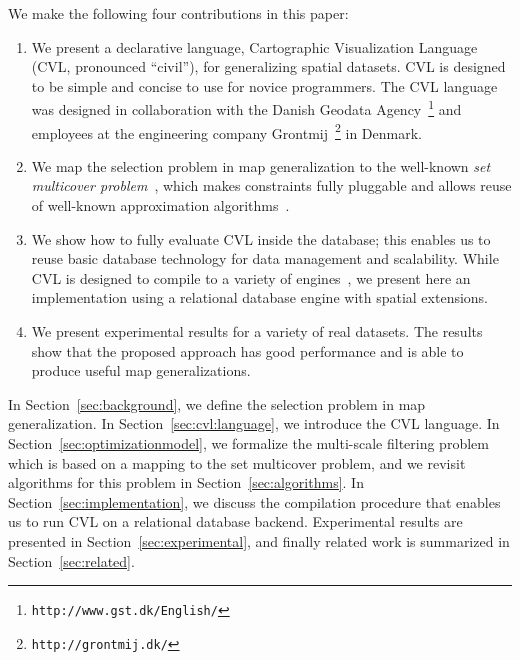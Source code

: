 We make the following four contributions in this paper:
\begin{enumerate}
\item We present a declarative language, Cartographic Visualization Language (CVL, pronounced ``civil''), for generalizing spatial datasets. CVL is designed to be simple and concise to use for novice programmers. The CVL language was designed in collaboration with the Danish Geodata Agency~\footnote{\texttt{http://www.gst.dk/English/}} and employees at the engineering company Grontmij~\footnote{\texttt{http://grontmij.dk/}} in Denmark.

\item We map the selection problem in map generalization to the well-known \emph{set multicover problem}~\cite{rajagopalan1998primal}, which makes constraints fully pluggable and allows reuse of well-known approximation algorithms~\cite{rajagopalan1998primal,vazirani2001approximation}.

\item We show how to fully evaluate CVL inside the database; this enables us to reuse basic database technology for data management and scalability. While CVL is designed to compile to a variety of engines~\cite{Stonebraker:2010:PDBMSvsMapReduce}, we present here an implementation using a relational database engine with spatial extensions.

\item We present experimental results for a variety of real datasets. The results show that the proposed approach has good performance and is able to produce useful map generalizations.
\end{enumerate}

In Section~\ref{sec:background}, we define the selection problem in map generalization. In Section~\ref{sec:cvl:language}, we introduce the CVL language. In Section~\ref{sec:optimizationmodel}, we formalize the multi-scale filtering problem which is based on a mapping to the set multicover problem, and we revisit algorithms for this problem in Section~\ref{sec:algorithms}. In Section~\ref{sec:implementation}, we discuss the compilation procedure that enables us to run CVL on a relational database backend. Experimental results are presented in Section~\ref{sec:experimental}, and finally related work is summarized in Section~\ref{sec:related}.
